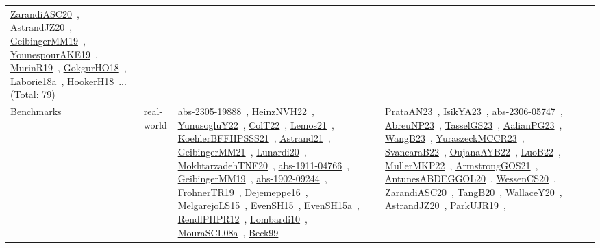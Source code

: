 {\begin{longtable}{lp{3cm}>{\raggedright\arraybackslash}p{6cm}>{\raggedright\arraybackslash}p{6cm}>{\raggedright\arraybackslash}p{8cm}}
\href{works/ZarandiASC20.pdf}{ZarandiASC20}~\cite{ZarandiASC20}, \href{works/AstrandJZ20.pdf}{AstrandJZ20}~\cite{AstrandJZ20}, \href{works/GeibingerMM19.pdf}{GeibingerMM19}~\cite{GeibingerMM19}, \href{works/YounespourAKE19.pdf}{YounespourAKE19}~\cite{YounespourAKE19}, \href{works/MurinR19.pdf}{MurinR19}~\cite{MurinR19}, \href{works/GokgurHO18.pdf}{GokgurHO18}~\cite{GokgurHO18}, \href{works/Laborie18a.pdf}{Laborie18a}~\cite{Laborie18a}, \href{works/HookerH18.pdf}{HookerH18}~\cite{HookerH18}... (Total: 79)\\
Benchmarks & real-world & \href{works/abs-2305-19888.pdf}{abs-2305-19888}~\cite{abs-2305-19888}, \href{works/HeinzNVH22.pdf}{HeinzNVH22}~\cite{HeinzNVH22}, \href{works/YunusogluY22.pdf}{YunusogluY22}~\cite{YunusogluY22}, \href{works/ColT22.pdf}{ColT22}~\cite{ColT22}, \href{works/Lemos21.pdf}{Lemos21}~\cite{Lemos21}, \href{works/KoehlerBFFHPSSS21.pdf}{KoehlerBFFHPSSS21}~\cite{KoehlerBFFHPSSS21}, \href{works/Astrand21.pdf}{Astrand21}~\cite{Astrand21}, \href{works/GeibingerMM21.pdf}{GeibingerMM21}~\cite{GeibingerMM21}, \href{works/Lunardi20.pdf}{Lunardi20}~\cite{Lunardi20}, \href{works/MokhtarzadehTNF20.pdf}{MokhtarzadehTNF20}~\cite{MokhtarzadehTNF20}, \href{works/abs-1911-04766.pdf}{abs-1911-04766}~\cite{abs-1911-04766}, \href{works/GeibingerMM19.pdf}{GeibingerMM19}~\cite{GeibingerMM19}, \href{works/abs-1902-09244.pdf}{abs-1902-09244}~\cite{abs-1902-09244}, \href{works/FrohnerTR19.pdf}{FrohnerTR19}~\cite{FrohnerTR19}, \href{works/Dejemeppe16.pdf}{Dejemeppe16}~\cite{Dejemeppe16}, \href{works/MelgarejoLS15.pdf}{MelgarejoLS15}~\cite{MelgarejoLS15}, \href{works/EvenSH15.pdf}{EvenSH15}~\cite{EvenSH15}, \href{works/EvenSH15a.pdf}{EvenSH15a}~\cite{EvenSH15a}, \href{works/RendlPHPR12.pdf}{RendlPHPR12}~\cite{RendlPHPR12}, \href{works/Lombardi10.pdf}{Lombardi10}~\cite{Lombardi10}, \href{works/MouraSCL08a.pdf}{MouraSCL08a}~\cite{MouraSCL08a}, \href{works/Beck99.pdf}{Beck99}~\cite{Beck99} & \href{works/PrataAN23.pdf}{PrataAN23}~\cite{PrataAN23}, \href{works/IsikYA23.pdf}{IsikYA23}~\cite{IsikYA23}, \href{works/abs-2306-05747.pdf}{abs-2306-05747}~\cite{abs-2306-05747}, \href{works/AbreuNP23.pdf}{AbreuNP23}~\cite{AbreuNP23}, \href{works/TasselGS23.pdf}{TasselGS23}~\cite{TasselGS23}, \href{works/AalianPG23.pdf}{AalianPG23}~\cite{AalianPG23}, \href{works/WangB23.pdf}{WangB23}~\cite{WangB23}, \href{works/YuraszeckMCCR23.pdf}{YuraszeckMCCR23}~\cite{YuraszeckMCCR23}, \href{works/SvancaraB22.pdf}{SvancaraB22}~\cite{SvancaraB22}, \href{works/OujanaAYB22.pdf}{OujanaAYB22}~\cite{OujanaAYB22}, \href{works/LuoB22.pdf}{LuoB22}~\cite{LuoB22}, \href{works/MullerMKP22.pdf}{MullerMKP22}~\cite{MullerMKP22}, \href{works/ArmstrongGOS21.pdf}{ArmstrongGOS21}~\cite{ArmstrongGOS21}, \href{works/AntunesABDEGGOL20.pdf}{AntunesABDEGGOL20}~\cite{AntunesABDEGGOL20}, \href{works/WessenCS20.pdf}{WessenCS20}~\cite{WessenCS20}, \href{works/ZarandiASC20.pdf}{ZarandiASC20}~\cite{ZarandiASC20}, \href{works/TangB20.pdf}{TangB20}~\cite{TangB20}, \href{works/WallaceY20.pdf}{WallaceY20}~\cite{WallaceY20}, \href{works/AstrandJZ20.pdf}{AstrandJZ20}~\cite{AstrandJZ20}, \href{works/ParkUJR19.pdf}{ParkUJR19}~\cite{ParkUJR19}, 
\end{longtable}}
